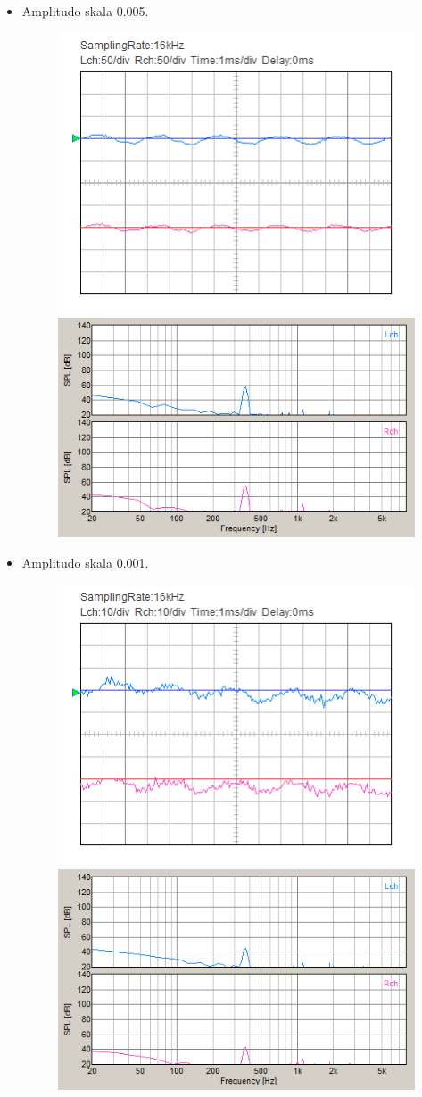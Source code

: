 \documentclass[12pt,]{article}
\begin{document}
\begin{itemize}
\begin{itemize}
\begin{itemize}
			\item Amplitudo skala 0.005.
			\begin{figure}[H]
				\centering
				\includegraphics[width=0.45\linewidth]{result/day_3/400_Hz/osi_tone0005}
				\includegraphics[width=0.45\linewidth]{result/day_3/400_Hz/fft_tone0005}
			\end{figure}
		
			\item Amplitudo skala 0.001.
			\begin{figure}[H]
				\centering
				\includegraphics[width=0.45\linewidth]{result/day_3/400_Hz/osi_tone0001}
				\includegraphics[width=0.45\linewidth]{result/day_3/400_Hz/fft_tone0001}
			\end{figure}
		

\end{itemize}
\end{itemize}
\end{itemize}
\end{document}
